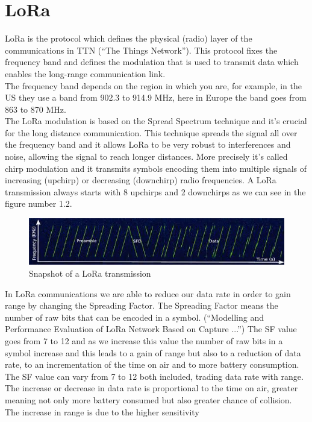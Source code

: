 \section{LoRa}
\label{sec:f-lora}
LoRa is the protocol which defines the physical (radio) layer of the
communications in TTN (“The Things Network”). This protocol fixes the
frequency band and defines the modulation that is used to transmit data
which enables the long-range communication link.\\
The frequency band depends on the region in which you are, for
example, in the US they use a band from 902.3 to 914.9 MHz, here in
Europe the band goes from 863 to 870 MHz.\\
The LoRa modulation is based on the Spread Spectrum technique and
it's crucial for the long distance communication. This technique spreads
the signal all over the frequency band and it allows LoRa to be very
robust to interferences and noise, allowing the signal to reach longer
distances. More precisely it's called chirp modulation and it transmits
symbols encoding them into multiple signals of increasing (upchirp) or
decreasing (downchirp) radio frequencies. A LoRa transmission always
starts with 8 upchirps and 2 downchirps as we can see in the figure
number 1.2.
\begin{figure}[htbp]
\includegraphics[width=\linewidth]{lorainitchirp.png}
\caption{Snapshot of a LoRa transmission}
\end{figure}
In LoRa communications we are able to reduce our data rate in order to
gain range by changing the Spreading Factor. The Spreading Factor
means the number of raw bits that can be encoded in a symbol.
(“Modelling and Performance Evaluation of LoRa Network Based on
Capture ...”) The SF value goes from 7 to 12 and as we increase this
value the number of raw bits in a symbol increase and this leads to a
gain of range but also to a reduction of data rate, to an incrementation
of the time on air and to more battery consumption. \\
The SF value can vary from 7 to 12 both included, trading data rate with
range. The increase or decrease in data rate is proportional to the time
on air, greater meaning not only more battery consumed but also greater
chance of collision. The increase in range is due to the higher sensitivity
